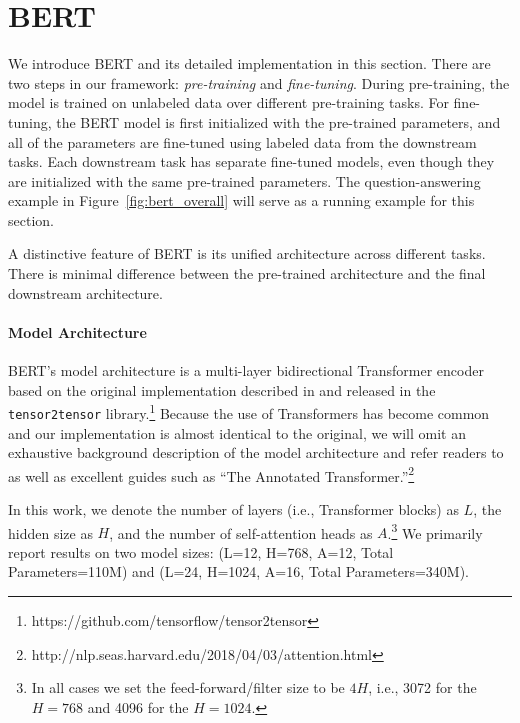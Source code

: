 


\section{BERT}
\label{sec:bert}

We introduce BERT and its detailed implementation in this section. There are two steps in our framework: {\em pre-training} and {\em fine-tuning}. 
During pre-training, the model is trained on unlabeled data over different pre-training tasks.
For fine-tuning, the BERT model is first initialized with the pre-trained parameters, and all of the parameters are fine-tuned using labeled data from the downstream tasks. 
Each downstream task has separate fine-tuned models, even though they
are initialized with the same pre-trained parameters. The question-answering example in Figure~\ref{fig:bert_overall} will serve as a running example for this section.

A distinctive feature of BERT is its unified architecture across different tasks.
There is minimal difference between the pre-trained architecture and the final downstream architecture.

\paragraph{Model Architecture}
BERT's model architecture is a multi-layer bidirectional Transformer encoder based on the original implementation described in \citet{vaswani-etal:2017:_atten} and released in the {\tt tensor2tensor} library.\footnote{https://github.com/tensorflow/tensor2tensor} Because the use of Transformers has become common and our implementation is almost identical to the original, we will omit an exhaustive background description of the model architecture and refer readers to \citet{vaswani-etal:2017:_atten} as well as excellent guides such as ``The Annotated Transformer.''\footnote{http://nlp.seas.harvard.edu/2018/04/03/attention.html}

In this work, we denote the number of layers (i.e., Transformer blocks) as $L$, the hidden size as $H$, and the number of self-attention heads as $A$.\footnote{In all cases we set the feed-forward/filter size to be $4H$, i.e., 3072 for the $H=768$ and 4096 for the $H=1024$.} We primarily report results on two model sizes: {\bf \bertbase} (L=12, H=768, A=12, Total Parameters=110M) and {\bf \bertlarge} (L=24, H=1024, A=16, Total Parameters=340M).

